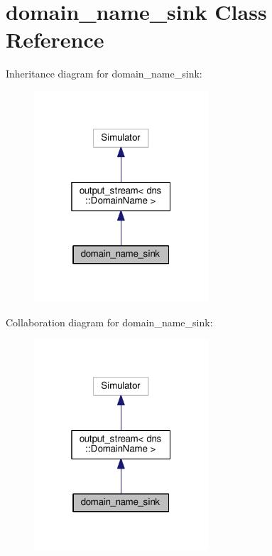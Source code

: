 \hypertarget{classdomain__name__sink}{}\section{domain\+\_\+name\+\_\+sink Class Reference}
\label{classdomain__name__sink}


Inheritance diagram for domain\+\_\+name\+\_\+sink\+:\nopagebreak
\begin{figure}[H]
\begin{center}
\leavevmode
\includegraphics[width=184pt]{classdomain__name__sink__inherit__graph}
\end{center}
\end{figure}


Collaboration diagram for domain\+\_\+name\+\_\+sink\+:\nopagebreak
\begin{figure}[H]
\begin{center}
\leavevmode
\includegraphics[width=184pt]{classdomain__name__sink__coll__graph}
\end{center}
\end{figure}
